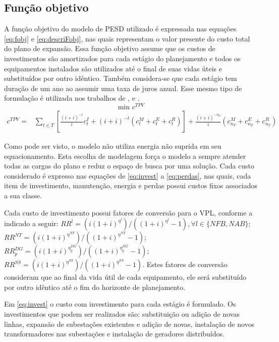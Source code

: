 \subsection{Função objetivo}
\label{sec:fobj}

A função objetivo do modelo de \ac{PESD} utilizado é expressada nas equações \eqref{eq:fobj} e \eqref{eq:descriFobj}, nas quais representam o valor presente do custo total do plano de expansão. Essa função objetivo assume que os custos de investimentos são amortizados para cada estágio do planejamento e todos os equipamentos instalados são utilizados até o final de suas vidas úteis e substituídos por outro idêntico. Também considera-se que cada estágio tem duração de um ano ao assumir uma taxa de juros anual. Esse mesmo tipo de formulação é utilizada nos trabalhos de ,   e .
\begin{equation}
    \text{min     } c^{TPV}
    \label{eq:fobj}
\end{equation}
\begin{align}
     c^{TPV}  = & \sum_{t\in T} \left[ \frac{(i +i)^{-t}}{i} c^I_t + (i +i)^{-t} (c^M_t + c^E_t+ c^R_t)\right] 
       +\frac{(i +i)^{-n_T}}{i} (c^M_{n_T}  + c^E_{n_T} + c^R_{n_T})
     \label{eq:descriFobj}
\end{align}

Como pode ser visto, o modelo não utiliza energia não suprida em seu equacionamento. Esta escolha de modelagem força o modelo a sempre atender todas as cargas do plano e reduz o espaço de busca por uma solução. 
Cada custo considerado é expresso nas equações de \eqref{eq:invest} a \eqref{eq:perdas}, nas quais, cada item de investimento, manutenção, energia e perdas possui custos fixos associados a sua classe.

Cada custo de investimento possui fatores de conversão para o \ac{VPL}, conforme a indicado a seguir: $RR^l = (i(1+i)^{\eta^l})/((1+i)^{\eta^l} - 1), \forall l \in \{NFB, NAB\}$; $RR^{NT} = (i(1+i)^{\eta^{NT}})/((1+i)^{\eta^{NT}} - 1)$;
$RR^{DG}_p = (i(1+i)^{\eta^{DG}_p})/((1+i)^{\eta^{DG}_p} - 1)$; $RR^{SS} = (i(1+i)^{\eta^{SS}})/((1+i)^{\eta^{SS}} - 1)$. Estes fatores de conversão consideram que ao final da vida útil de cada equipamento, ele será substituído por outro idêntico até o fim do horizonte de planejamento.

Em \eqref{eq:invest} o custo com investimento para cada estágio é formulado. Os investimentos que podem ser realizados são: substituição ou adição de novas linhas, expansão de subestações existentes e adição de novas, instalação de novos transformadores nas subestações e instalação de geradores distribuídos.

